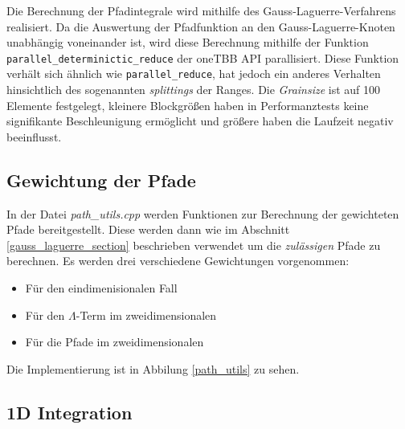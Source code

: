 Die Berechnung der Pfadintegrale wird mithilfe des Gauss-Laguerre-Verfahrens realisiert.
Da die Auswertung der Pfadfunktion an den Gauss-Laguerre-Knoten unabhängig voneinander ist,
 wird diese Berechnung mithilfe der Funktion \linebreak \texttt{parallel\_determinictic\_reduce} der oneTBB API parallisiert.
Diese Funktion verhält sich ähnlich wie \texttt{parallel\_reduce}, hat jedoch ein anderes Verhalten hinsichtlich des sogenannten \textit{splittings} der Ranges. 
Die \textit{Grainsize} ist auf 100 Elemente festgelegt, kleinere Blockgrößen haben in Performanztests keine signifikante Beschleunigung ermöglicht und größere haben die Laufzeit negativ beeinflusst.

\begin{center}
    
    \label{gauss_laguerre_impl}
\end{center}

\subsection{Gewichtung der Pfade}

In der Datei \textit{path\_utils.cpp} werden Funktionen zur Berechnung der gewichteten Pfade bereitgestellt.
Diese werden dann wie im Abschnitt \ref{gauss_laguerre_section} beschrieben verwendet um die \textit{zulässigen} Pfade zu berechnen.
Es werden drei verschiedene Gewichtungen vorgenommen:
\begin{itemize}
    \item Für den eindimenisionalen Fall
    \item Für den $\Lambda$-Term im zweidimensionalen
    \item Für die Pfade im zweidimensionalen
\end{itemize}

Die Implementierung ist in Abbilung \ref{path_utils} zu sehen.

\begin{center}
    
    \label{path_utils}
\end{center}

\subsection{1D Integration}


